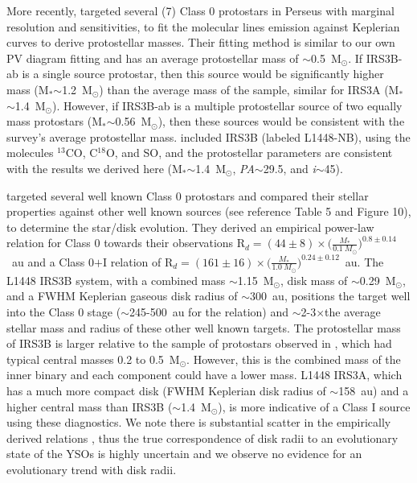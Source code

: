 \documentclass[twocolumn, 12pt]{aastex63}
\newcommand{\ceo}{C$^{18}$O}
\newcommand{\tco}{$^{13}$CO}
\renewcommand{\deg}{\degr}
\newcommand{\ab}{$\sim$}
\newcommand{\mstar}{M$_{*}$}
\newcommand{\solm}{M$_{\odot}$}
\newcommand{\msun}{M$_{\odot}$}
\begin{document}
More recently, \citet{2020AA...635A..15M}\space targeted several (7) Class 0 protostars in Perseus with marginal resolution and sensitivities, to fit the molecular lines emission against Keplerian curves to derive protostellar masses. Their fitting method is similar to our own PV diagram fitting and has an average protostellar mass of \ab0.5~\msun. If IRS3B-ab is a single source protostar, then this source would be significantly higher mass (\mstar\ab1.2~\msun) than the average mass of the sample, similar for IRS3A (\mstar\ab1.4~\msun). However, if IRS3B-ab is a multiple protostellar source of two equally mass protostars (\mstar\ab0.56~\msun), then these sources would be consistent with the survey's average protostellar mass.
\citet{2020AA...635A..15M}\space {} included IRS3B (labeled L1448-NB), using the molecules \tco, \ceo, and SO, and the protostellar parameters are consistent with the results we derived here (\mstar\ab1.4~\msun, \textit{PA}\ab29.5\deg, and \textit{i}\ab45\deg).

\citet[][]{2017ApJ...834..178Y} targeted several well known Class 0 protostars and compared their stellar properties against other well known sources (see reference Table 5 and Figure 10), to determine the star/disk evolution. They derived an empirical power-law relation for Class 0 towards their observations R$_{d}=(44\pm8)\times\big(\frac{M_{*}}{0.1~M_{\odot}}\big)^{0.8\pm0.14}$~au and a Class 0$+$I relation of R$_{d}=(161\pm16)\times\big(\frac{M_{*}}{1.0~M_{\odot}}\big)^{0.24\pm0.12}$~au. The L1448 IRS3B system, with a combined mass \ab1.15~\solm, disk mass of \ab0.29~\solm, and a FWHM Keplerian gaseous disk radius of \ab300~au, positions the target well into the Class 0 stage (\ab245-500~au for the \citet[][]{2017ApJ...834..178Y} relation) and \ab2-3$\times$\space the average stellar mass and radius of these other well known targets. The protostellar mass of IRS3B is larger relative to the sample of protostars observed in \citet[][]{2017ApJ...834..178Y}, which had typical central masses 0.2 to 0.5~\solm. However, this is the combined mass of the inner binary and each component could have a lower mass. L1448 IRS3A, which has a much more compact disk (FWHM Keplerian disk radius of \ab158~au) and a higher central mass than IRS3B (\ab1.4~\solm), is more indicative of a Class I source using these diagnostics. We note there is substantial scatter in the empirically derived relations \citep{2020ApJ...890..130T}, thus the true correspondence of disk radii to an evolutionary state of the YSOs is highly uncertain and we observe no evidence for an evolutionary trend with disk radii.
\end{document}
